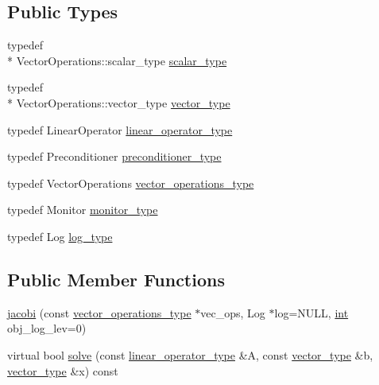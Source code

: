 \subsection*{Public Types}
\begin{DoxyCompactItemize}
\item 
typedef \\*
Vector\-Operations\-::scalar\-\_\-type \hyperlink{classnumerical__algos_1_1lin__solvers_1_1jacobi_aec612c61c39f98f8ed15c8c047d0ac6f}{scalar\-\_\-type}
\item 
typedef \\*
Vector\-Operations\-::vector\-\_\-type \hyperlink{classnumerical__algos_1_1lin__solvers_1_1jacobi_a4888a70950925266c654b6ec835dee85}{vector\-\_\-type}
\item 
typedef Linear\-Operator \hyperlink{classnumerical__algos_1_1lin__solvers_1_1jacobi_adb16ec28c8268884b3649fefc44c4b51}{linear\-\_\-operator\-\_\-type}
\item 
typedef Preconditioner \hyperlink{classnumerical__algos_1_1lin__solvers_1_1jacobi_acc0f0bdcc2f122409be20961a7144178}{preconditioner\-\_\-type}
\item 
typedef Vector\-Operations \hyperlink{classnumerical__algos_1_1lin__solvers_1_1jacobi_ab8b9ebf933c4357daf0f00205decc710}{vector\-\_\-operations\-\_\-type}
\item 
typedef Monitor \hyperlink{classnumerical__algos_1_1lin__solvers_1_1jacobi_a62ed1ba2b2ed62bbe1fc38911770d59a}{monitor\-\_\-type}
\item 
typedef Log \hyperlink{classnumerical__algos_1_1lin__solvers_1_1jacobi_ab93ff757d620bff642b65e8cc7e4b4e5}{log\-\_\-type}
\end{DoxyCompactItemize}
\subsection*{Public Member Functions}
\begin{DoxyCompactItemize}
\item 
\hyperlink{classnumerical__algos_1_1lin__solvers_1_1jacobi_a9b43a2c22a3920cc57f9fd03fe2051fc}{jacobi} (const \hyperlink{classnumerical__algos_1_1lin__solvers_1_1iter__solver__base_a1c0c7f5af3b439d5a53ce2433d6acb79}{vector\-\_\-operations\-\_\-type} $\ast$vec\-\_\-ops, Log $\ast$log=N\-U\-L\-L, \hyperlink{classint}{int} obj\-\_\-log\-\_\-lev=0)
\item 
virtual bool \hyperlink{classnumerical__algos_1_1lin__solvers_1_1jacobi_aebc8f746eb9b5f412c6ea79a4149621f}{solve} (const \hyperlink{classnumerical__algos_1_1lin__solvers_1_1iter__solver__base_a547488978437ea7057c7fb113261407d}{linear\-\_\-operator\-\_\-type} \&A, const \hyperlink{classnumerical__algos_1_1lin__solvers_1_1jacobi_a4888a70950925266c654b6ec835dee85}{vector\-\_\-type} \&b, \hyperlink{classnumerical__algos_1_1lin__solvers_1_1jacobi_a4888a70950925266c654b6ec835dee85}{vector\-\_\-type} \&x) const 
\end{DoxyCompactItemize}
